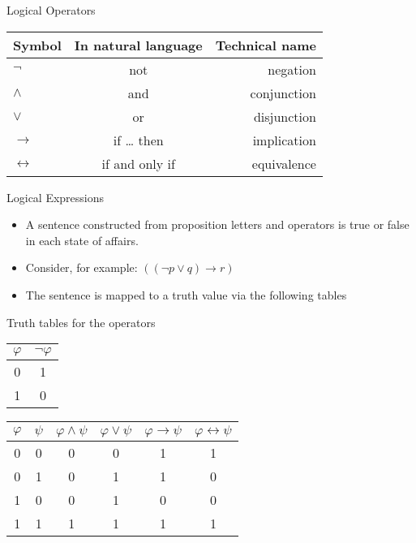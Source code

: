 \documentclass[
  ignorenonframetext,
]{beamer}
\providecommand{\tightlist}{%
  \setlength{\itemsep}{0pt}\setlength{\parskip}{0pt}}
\begin{document}
\begin{frame}{Logical Operators}
\protect\hypertarget{logical-operators}{}

\begin{longtable}[]{@{}lcr@{}}
\toprule
Symbol & In natural language & Technical name\tabularnewline
\midrule
\endhead
\(\neg\) & not & negation\tabularnewline
\(\wedge\) & and & conjunction\tabularnewline
\(\vee\) & or & disjunction\tabularnewline
\(\rightarrow\) & if \ldots{} then & implication\tabularnewline
\(\leftrightarrow\) & if and only if & equivalence\tabularnewline
\bottomrule
\end{longtable}

\end{frame}

\begin{frame}{Logical Expressions}
\protect\hypertarget{logical-expressions}{}

\begin{itemize}[<+->]
\tightlist
\item
  A sentence constructed from proposition letters and operators is true
  or false in each state of affairs.
\item
  Consider, for example: \((({\neg}p \vee q) \rightarrow r)\)
\item
  The sentence is mapped to a truth value via the following tables
\end{itemize}

\end{frame}

\begin{frame}{Truth tables for the operators}
\protect\hypertarget{truth-tables-for-the-operators}{}

\begin{longtable}[]{@{}cc@{}}
\toprule
\(\varphi\) & \(\neg\varphi\)\tabularnewline
\midrule
\endhead
0 & 1\tabularnewline
1 & 0\tabularnewline
\bottomrule
\end{longtable}

\begin{longtable}[]{@{}cccccc@{}}
\toprule
\(\varphi\) & \(\psi\) & \(\varphi \wedge \psi\) & \(\varphi \vee \psi\)
& \(\varphi \rightarrow \psi\) &
\(\varphi \leftrightarrow \psi\)\tabularnewline
\midrule
\endhead
0 & 0 & 0 & 0 & 1 & 1\tabularnewline
0 & 1 & 0 & 1 & 1 & 0\tabularnewline
1 & 0 & 0 & 1 & 0 & 0\tabularnewline
1 & 1 & 1 & 1 & 1 & 1\tabularnewline
\bottomrule
\end{longtable}

\end{frame}
\end{document}
